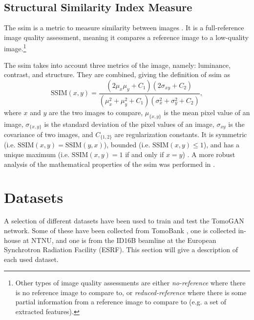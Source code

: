 \subsection{Structural Similarity Index Measure}
The \gls{ssim} is a metric to measure similarity between images \cite{ssim}. It is a full-reference image quality assessment, meaning it compares a reference image to a low-quality image.\footnote{Other types of image quality assessments are either \textit{no-reference} where there is no reference image to compare to, or \textit{reduced-reference} where there is some partial information from a reference image to compare to (e.g. a set of extracted features)\cite{ssim}. }

The \gls{ssim} takes into account three metrics of the image, namely: luminance, contrast, and structure. They are combined, giving the definition of \gls{ssim} as \cite{ssim}
\begin{equation}
    \label{eq:ssim}
    \text{SSIM}\left(x,y\right) = \frac{\left( 2\mu_x \mu_y + C_1 \right) \left( 2\sigma_{xy} + C_2 \right)}{\left( \mu_x^2 + \mu_y^2 + C_1 \right) \left( \sigma_x^2 + \sigma_y^2 + C_2 \right)},
\end{equation}
where $x$ and $y$ are the two images to compare, $\mu_{\{x,y\}}$ is the mean pixel value of an image, $\sigma_{\{x,y\}}$ is the standard deviation of the pixel values of an image, $\sigma_{xy}$ is the covariance of two images, and $C_{\{1,2\}}$ are regularization constants. It is symmetric (i.e. $\text{SSIM}\left(x,y\right) = \text{SSIM}\left(y,x\right)$), bounded (i.e. $\text{SSIM}\left(x,y\right) \leq 1$), and has a unique maximum (i.e. $\text{SSIM}\left(x,y\right) = 1$ if and only if $x = y$) \cite{ssim}. A more robust analysis of the mathematical properties of the \gls{ssim} was performed in \cite{6059504}.


\section{Datasets}
\label{sec:method:datasets}
A selection of different datasets have been used to train and test the TomoGAN network. Some of these have been collected from TomoBank \cite{TomoBank}, one is collected in-house at NTNU, and one is from the ID16B beamline at the European Synchrotron Radiation Facility (ESRF). This section will give a description of each used dataset. 

